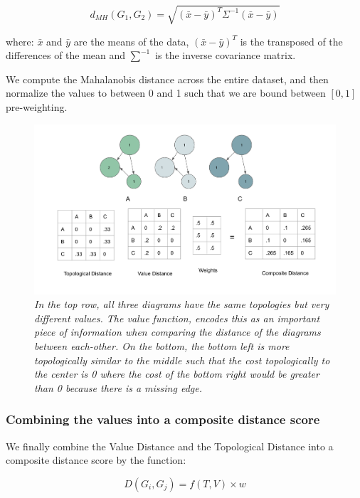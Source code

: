 \begin{equation}
d_{MH}(G_{1}, G_{2}) = \sqrt{(\bar{x}-\bar{y})^{T}\Sigma^{-1}(\bar{x}-\bar{y})}
\end{equation}

where: $\bar{x}$ and $\bar{y}$  are the means of the data, $(\bar{x}-\bar{y})^{T}$ is the transposed of the differences of the mean and $\sum^{-1}$ is the inverse covariance matrix.

We compute the Mahalanobis distance across the entire dataset, and then normalize the values to between 0 and 1 such that we are bound between $[0,1]$ pre-weighting.

\begin{figure}[t]
	\centering
        \includegraphics[width=1\textwidth]{images/value_cost.png}
	\caption{\textit{In the top row, all three diagrams have the same topologies but very different values. The value function, encodes this as an important piece of information when comparing the distance of the diagrams between each-other. On the bottom, the bottom left is more topologically similar to the middle such that the cost topologically to the center is 0 where the cost of the bottom right would be greater than 0 because there is a missing edge. }}
	\label{fig:value_cost}
\end{figure}

\subsubsection{Combining the values into a composite distance score}
\label{subsec:distance_score_composite}

We finally combine the Value Distance and the Topological Distance into a composite distance score by the function:

\begin{equation}
D(G_{i},G_{j}) = f(T,V)\times{w}
\end{equation}


